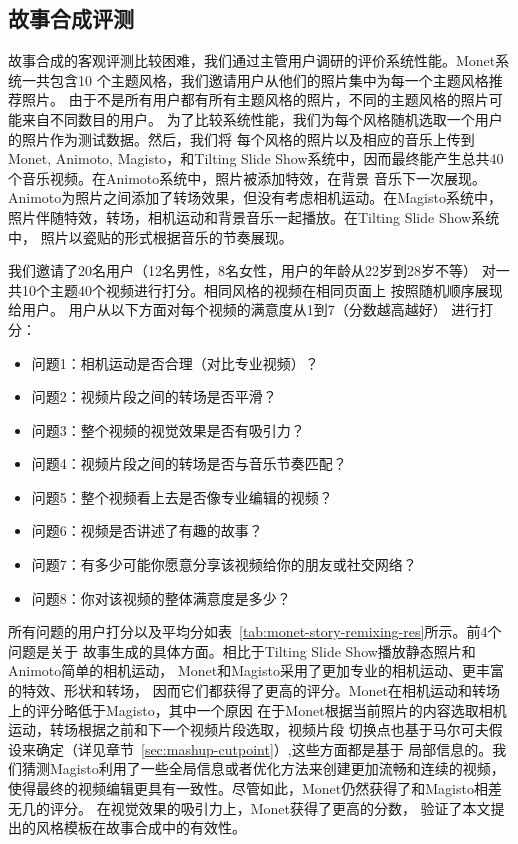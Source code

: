 \subsection{故事合成评测}
故事合成的客观评测比较困难，我们通过主管用户调研的评价系统性能。Monet系统一共包含10
个主题风格，我们邀请用户从他们的照片集中为每一个主题风格推荐照片。
由于不是所有用户都有所有主题风格的照片，不同的主题风格的照片可能来自不同数目的用户。
为了比较系统性能，我们为每个风格随机选取一个用户的照片作为测试数据。然后，我们将
每个风格的照片以及相应的音乐上传到Monet, Animoto, Magisto，和Tilting Slide
Show系统中，因而最终能产生总共40个音乐视频。在Animoto系统中，照片被添加特效，在背景
音乐下一次展现。Animoto为照片之间添加了转场效果，但没有考虑相机运动。在Magisto系统中，
照片伴随特效，转场，相机运动和背景音乐一起播放。在Tilting Slide Show系统中，
照片以瓷贴的形式根据音乐的节奏展现。

我们邀请了20名用户（12名男性，8名女性，用户的年龄从22岁到28岁不等）
对一共10个主题40个视频进行打分。相同风格的视频在相同页面上
按照随机顺序展现给用户。
用户从以下方面对每个视频的满意度从1到7（分数越高越好）
进行打分：

\begin{itemize}
    \item 问题1：相机运动是否合理（对比专业视频）？
    \item 问题2：视频片段之间的转场是否平滑？
    \item 问题3：整个视频的视觉效果是否有吸引力？
    \item 问题4：视频片段之间的转场是否与音乐节奏匹配？
    \item 问题5：整个视频看上去是否像专业编辑的视频？
    \item 问题6：视频是否讲述了有趣的故事？
    \item 问题7：有多少可能你愿意分享该视频给你的朋友或社交网络？
    \item 问题8：你对该视频的整体满意度是多少？
\end{itemize}

所有问题的用户打分以及平均分如表~\ref{tab:monet-story-remixing-res}所示。前4个问题是关于
故事生成的具体方面。相比于Tilting Slide Show播放静态照片和Animoto简单的相机运动，
Monet和Magisto采用了更加专业的相机运动、更丰富的特效、形状和转场，
因而它们都获得了更高的评分。Monet在相机运动和转场上的评分略低于Magisto，其中一个原因
在于Monet根据当前照片的内容选取相机运动，转场根据之前和下一个视频片段选取，视频片段
切换点也基于马尔可夫假设来确定（详见章节~\ref{sec:mashup-cutpoint}）,这些方面都是基于
局部信息的。我们猜测Magisto利用了一些全局信息或者优化方法来创建更加流畅和连续的视频，
使得最终的视频编辑更具有一致性。尽管如此，Monet仍然获得了和Magisto相差无几的评分。
在视觉效果的吸引力上，Monet获得了更高的分数，
验证了本文提出的风格模板在故事合成中的有效性。


